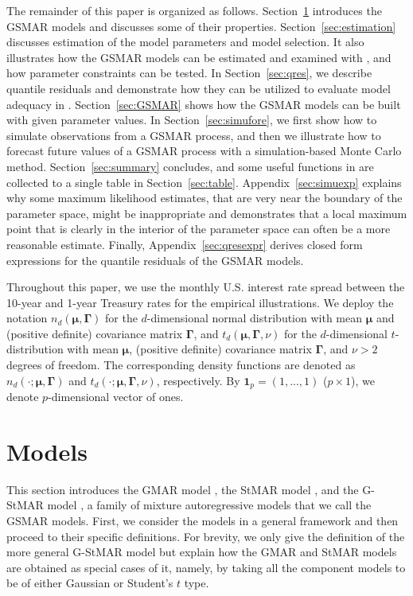 \documentclass[nojss]{jss} %
\begin{document}
The remainder of this paper is organized as follows. Section~\ref{sec:models} introduces the GSMAR models and discusses some of their properties. Section~\ref{sec:estimation} discusses estimation of the model parameters and model selection. It also illustrates how the GSMAR models can be estimated and examined with , and how parameter constraints can be tested. In Section~\ref{sec:qres}, we describe quantile residuals and demonstrate how they can be utilized to evaluate model adequacy in . Section~\ref{sec:GSMAR} shows how the GSMAR models can be built with given parameter values. In Section~\ref{sec:simufore}, we first show how to simulate observations from a GSMAR process, and then we illustrate how to forecast future values of a GSMAR process with a simulation-based Monte Carlo method. Section~\ref{sec:summary} concludes, and some useful functions in  are collected to a single table in Section~\ref{sec:table}. Appendix~\ref{sec:simuexp} explains why some maximum likelihood estimates, that are very near the boundary of the parameter space, might be inappropriate and demonstrates that a local maximum point that is clearly in the interior of the parameter space can often be a more reasonable estimate. Finally, Appendix~\ref{sec:qresexpr} derives closed form expressions for the quantile residuals of the GSMAR models.

Throughout this paper, we use the monthly U.S. interest rate spread between the 10-year and 1-year Treasury rates for the empirical illustrations. We deploy the notation $n_d(\boldsymbol{\mu},\boldsymbol{\Gamma})$ for the $d$-dimensional normal distribution with mean $\boldsymbol{\mu}$ and (positive definite) covariance matrix $\boldsymbol{\Gamma}$, and $t_d(\boldsymbol{\mu},\boldsymbol{\Gamma},\nu)$ for the $d$-dimensional $t$-distribution with mean $\boldsymbol{\mu}$, (positive definite) covariance matrix $\boldsymbol{\Gamma}$, and $\nu>2$ degrees of freedom. The corresponding density functions are denoted as $n_d(\cdot;\boldsymbol{\mu},\boldsymbol{\Gamma})$ and $t_d(\cdot;\boldsymbol{\mu},\boldsymbol{\Gamma},\nu)$, respectively. By $\boldsymbol{1}_p=(1,...,1)$ ($p \times 1$), we denote $p$-dimensional vector of ones.


\section{Models}\label{sec:models}

This section introduces the GMAR model \citep{Kalliovirta+Meitz+Saikkonen:2015}, the StMAR model \citep{Meitz+Preve+Saikkonen:2021}, and the G-StMAR model \citep{Virolainen:2020}, a family of mixture autoregressive models that we call the GSMAR models. First, we consider the models in a general framework and then proceed to their specific definitions. For brevity, we only give the definition of the more general G-StMAR model but explain how the GMAR and StMAR models are obtained as special cases of it, namely, by taking all the component models to be of either Gaussian or Student's $t$ type.
\end{document}
